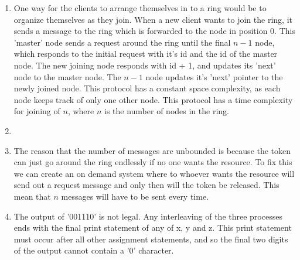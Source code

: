 \documentclass{article}
\begin{document}
\begin{enumerate}
	\item

One way for the clients to arrange themselves in to a ring would be to organize themselves as they join. When a new client wants to join the ring, it sends a message to the ring which is forwarded to the node in position 0. This 'master' node sends a request around the ring until the final \(n-1\) node, which responds to the initial request with it's id and the id of the master node. The new joining node responds with id + 1, and updates its 'next' node to the master node. The \(n-1\) node updates it's 'next' pointer to the newly joined node. This protocol has a constant space complexity, as each node keeps track of only one other node. This protocol has a time complexity for joining of \(n\), where \(n\) is the number of nodes in the ring.

	\item

	\item

The reason that the number of messages are unbounded is because the token can just go around the ring endlessly if no one wants the resource. To fix this we can create an on demand system where to whoever wants the resource will send out a request message and only then will the token be released. This mean that \(n\) messages will have to be sent every time.

	\item

The output of '001110' is not legal. Any interleaving of the three processes ends with the final print statement of any of x, y and z. This print statement must occur after all other assignment statements, and so the final two digits of the output cannot contain a '0' character.

\end{enumerate}
\end{document}
